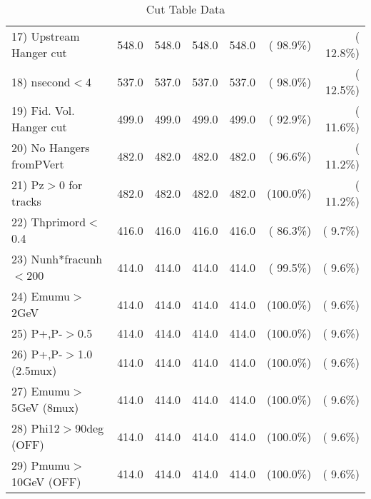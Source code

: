 \begin{table}[h!]
\begin{tabular}{||l||r|r|r|r|r|r||}
 17) Upstream Hanger cut  &        548.0 &        548.0 &        548.0 &        548.0 & ( 98.9\%) & ( 12.8\%) \\
 18) nsecond$<$4          &        537.0 &        537.0 &        537.0 &        537.0 & ( 98.0\%) & ( 12.5\%) \\
 19) Fid. Vol. Hanger cut &        499.0 &        499.0 &        499.0 &        499.0 & ( 92.9\%) & ( 11.6\%) \\
 20) No Hangers fromPVert &        482.0 &        482.0 &        482.0 &        482.0 & ( 96.6\%) & ( 11.2\%) \\
 21) Pz$>$0 for tracks    &        482.0 &        482.0 &        482.0 &        482.0 & (100.0\%) & ( 11.2\%) \\
 22) Thprimord$<$0.4      &        416.0 &        416.0 &        416.0 &        416.0 & ( 86.3\%) & (  9.7\%) \\
 23) Nunh*fracunh$<$200   &        414.0 &        414.0 &        414.0 &        414.0 & ( 99.5\%) & (  9.6\%) \\
 24) Emumu$>$2GeV         &        414.0 &        414.0 &        414.0 &        414.0 & (100.0\%) & (  9.6\%) \\
 25) P+,P-$>$0.5          &        414.0 &        414.0 &        414.0 &        414.0 & (100.0\%) & (  9.6\%) \\
 26) P+,P-$>$1.0 (2.5mux) &        414.0 &        414.0 &        414.0 &        414.0 & (100.0\%) & (  9.6\%) \\
 27) Emumu$>$5GeV  (8mux) &        414.0 &        414.0 &        414.0 &        414.0 & (100.0\%) & (  9.6\%) \\
 28) Phi12$>$90deg  (OFF) &        414.0 &        414.0 &        414.0 &        414.0 & (100.0\%) & (  9.6\%) \\
 29) Pmumu$>$10GeV  (OFF) &        414.0 &        414.0 &        414.0 &        414.0 & (100.0\%) & (  9.6\%) \\
 \hline
 \hline
 \end{tabular}
 \caption{Cut Table  Data     }
 \label{tab-cutcohjpsi-mumu_data}
 \end{table}
